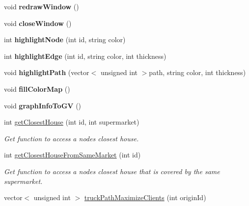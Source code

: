 \begin{DoxyCompactItemize}
void {\bfseries redraw\+Window} ()
\item 
\hypertarget{class_market_delivery_system_a22ab8541d65d035f1a8a27987d900e01}{}\label{class_market_delivery_system_a22ab8541d65d035f1a8a27987d900e01} 
void {\bfseries close\+Window} ()
\item 
\hypertarget{class_market_delivery_system_a0146accc695a9bb2a997c001e67ec521}{}\label{class_market_delivery_system_a0146accc695a9bb2a997c001e67ec521} 
int {\bfseries highlight\+Node} (int id, string color)
\item 
\hypertarget{class_market_delivery_system_ac96e829dadff734a4f50cda140e18002}{}\label{class_market_delivery_system_ac96e829dadff734a4f50cda140e18002} 
int {\bfseries highlight\+Edge} (int id, string color, int thickness)
\item 
\hypertarget{class_market_delivery_system_abad62f4a2885aebb2a349feebb2ee5aa}{}\label{class_market_delivery_system_abad62f4a2885aebb2a349feebb2ee5aa} 
void {\bfseries highlight\+Path} (vector$<$ unsigned int $>$path, string color, int thickness)
\item 
\hypertarget{class_market_delivery_system_ab5b427ba79ea3edac5c652b7122ee8a1}{}\label{class_market_delivery_system_ab5b427ba79ea3edac5c652b7122ee8a1} 
void {\bfseries fill\+Color\+Map} ()
\item 
\hypertarget{class_market_delivery_system_a886c4da92fae070bbf0065a5fbc45c66}{}\label{class_market_delivery_system_a886c4da92fae070bbf0065a5fbc45c66} 
void {\bfseries graph\+Info\+To\+GV} ()
\item 
int \hyperlink{class_market_delivery_system_a6e527c880df486f29fa5df82ff140d17}{get\+Closest\+House} (int id, int supermarket)
\begin{DoxyCompactList}\small\item\em Get function to access a node\textquotesingle{}s closest house. \end{DoxyCompactList}\item 
int \hyperlink{class_market_delivery_system_a93e0f821f91f165e7f69c8589b1ce5b4}{get\+Closest\+House\+From\+Same\+Market} (int id)
\begin{DoxyCompactList}\small\item\em Get function to access a node\textquotesingle{}s closest house that is covered by the same supermarket. \end{DoxyCompactList}\item 
vector$<$ unsigned int $>$ \hyperlink{class_market_delivery_system_aa2d677bd82dc281d44980012a18691f0}{truck\+Path\+Maximize\+Clients} (int origin\+Id)

\end{DoxyCompactItemize}
